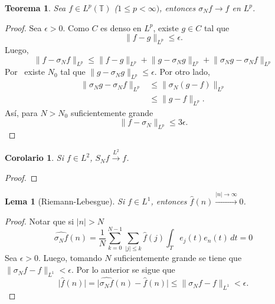 \documentclass{article}
\newtheorem{Teorema}{Teorema}
\newtheorem{Lema}{Lema}
\newtheorem{Corolario}{Corolario}
\theoremstyle{plain}
\theoremstyle{definition}
\newcommand{\T}{\mathbb{T}}
\newcommand{\abs}[1]{\lvert #1 \rvert}
\newcommand{\normL}[2]{\lVert #2 \rVert_{L^#1}}
\begin{document}
\begin{Teorema}
  Sea \(f\in L^p(\T)\) (\(1\le p<\infty)\), entonces \(\sigma_N f \to f\) en \(L^p\).    
\end{Teorema}
\begin{proof}
  Sea \(\epsilon > 0\).
  Como \(C\) es denso en \(L^p\), existe \(g\in C\) tal que
  \begin{displaymath}
    \normL{p}{ f - g } \le \epsilon.
  \end{displaymath}
  Luego,
  \begin{displaymath}
    \normL{p}{ f-\sigma_N f }
    \le
    \normL{p}{ f - g }
    +
    \normL{p}{ g - \sigma_N g }
    +
    \normL{p}{\sigma_N g - \sigma_N f}
  \end{displaymath}
  Por~ existe \(N_0\) tal que \(\normL{p}{ g - \sigma_N g } \le \epsilon\).  
  Por otro lado,
  \begin{align*}
    \normL{p}{\sigma_N g - \sigma_N f}
    &\le
    \normL{p}{\sigma_N (g-f)}
    \\&\le
    \normL{p}{g-f}.
  \end{align*}
  Así, para \(N>N_0\) suficientemente grande
  \begin{displaymath}
    \normL{p}{f-\sigma_N} \le 3\epsilon.
  \end{displaymath}
\end{proof}

\begin{Corolario}
  Si \(f\in L^2\), \(S_N f \xrightarrow{L^2} f\).
\end{Corolario}
\begin{proof}
\end{proof}

\begin{Lema}[Riemann{-}Lebesgue]
  Si \(f\in L^1\), entonces \(\hat f(n) \xrightarrow{\abs{n}\to\infty} 0\).  
\end{Lema}
\begin{proof}
  Notar que si \(\abs{n}>N\) 
  \begin{displaymath}
    \widehat{\sigma_N f}(n)
    =
    \frac{1}{N}
    \sum_{k=0}^{N-1}
      \sum_{\abs{j} \le k}
        \hat{f}(j)
        \int_{T} e_j(t) e_n(t)\, dt
    =
    0
  \end{displaymath}
  Sea \(\epsilon > 0\). Luego, tomando \(N\) suficientemente grande se tiene que 
  \(\normL{1}{\sigma_N f - f} < \epsilon\). Por lo anterior se sigue que
  \begin{displaymath}
    \abs{ \hat f(n) }
    =
    \abs{ \widehat{\sigma_N f}(n) - \hat f(n) }
    \le
    \normL{1}{\sigma_N f - f} < \epsilon.
  \end{displaymath}
\end{proof}
\end{document}
